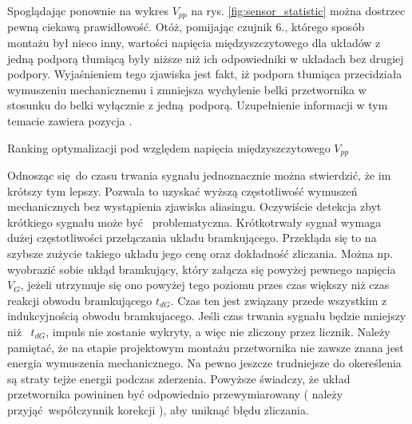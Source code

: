  \indent Spoglądając ponownie na wykres $V_{pp}$ na rys. \ref{fig:sensor_statistic}
 można dostrzec pewną ciekawą prawidłowość. Otóż, pomijając czujnik 6., którego sposób
 montażu był nieco inny, wartości napięcia międzyszczytowego dla układów z jedną podporą
 tłumiącą były niższe niż ich odpowiedniki w układach bez drugiej podpory. Wyjaśnieniem
 tego zjawiska jest fakt, iż podpora tłumiąca przecidziała wymuszeniu mechanicznemu i 
 zmniejsza wychylenie belki przetwornika w stosunku do belki wyłącznie z jedną podporą.
 Uzupełnienie informacji w tym temacie zawiera pozycja \cite{belkowy_sensor}.


\begin{table}[h]
  \caption{Ranking optymalizacji pod względem napięcia międzyszczytowego $V_{pp}$}
  \label{fig:sensor_selection_rank_vpp}

  \centering
\end{table}
 
\indent Odnosząc się do czasu trwania sygnału jednoznacznie można stwierdzić, 
że im krótszy tym lepszy. Pozwala to uzyskać wyższą częstotliwość wymuszeń mechanicznych 
bez wystąpienia zjawiska aliasingu. Oczywiście detekcja zbyt krótkiego sygnału może być 
problematyczna. Krótkotrwały sygnał wymaga dużej częstotliwości przełączania układu bramkującego.
Przekłąda się to na szybsze zużycie takiego układu jego cenę oraz dokładność zliczania. 
Można np. wyobrazić sobie ukłąd bramkujący, który załącza się powyżej pewnego napięcia
$V_G$, jeżeli utrzymuje się ono powyżej tego poziomu przes czas większy niż czas reakcji 
obwodu bramkującego $t_{dG}$. Czas ten jest związany przede wszystkim z indukcyjnością 
obwodu bramkujacego. Jeśli czas trwania sygnału będzie mniejszy niż  $t_{dG}$, 
impuls nie zostanie wykryty, a więc nie zliczony przez licznik.
Należy pamiętać, że na etapie projektowym montażu przetwornika nie zawsze znana jest energia
wymuszenia mechanicznego. Na pewno jeszcze trudniejsze do okereślenia są straty tejże energii
podczas zderzenia. Powyższe świadczy, że układ przetwornika powininen być odpowiednio
przewymiarowany ( należy przyjąć współczynnik korekcji ), aby uniknąć błędu zliczania.  

